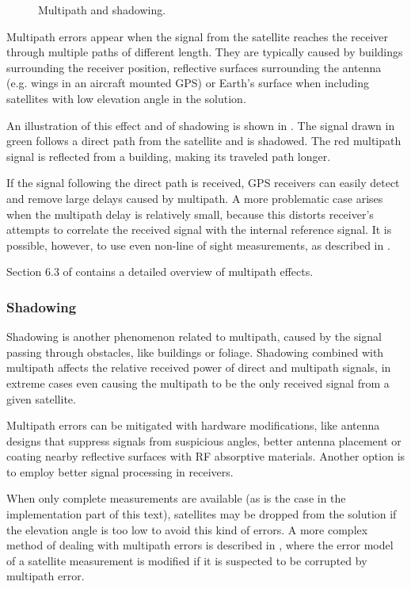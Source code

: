 \begin{figure}[t]
	\centering
	
	\caption{Multipath and shadowing.}
	\label{fig:multipath}
\end{figure}

Multipath errors appear when the signal from the satellite reaches the receiver
through multiple paths of different length.
They are typically caused by buildings surrounding the receiver position,
reflective surfaces surrounding the antenna (e.g. wings in an aircraft mounted GPS) or Earth's surface
when including satellites with low elevation angle in the solution.

An illustration of this effect and of shadowing is shown in .
The signal drawn in green follows a direct path from the satellite and is shadowed.
The red multipath signal is reflected from a building, making its traveled path longer.

If the signal following the direct path is received, GPS receivers can easily detect and remove large delays caused by multipath.
A more problematic case arises when the multipath delay is relatively small, because this distorts
receiver's attempts to correlate the received signal with the internal reference signal.
It is possible, however, to use even non-line of sight measurements, as described in \cite{bourdeau12}.

Section 6.3 of \cite{kaplan06} contains a detailed overview of multipath effects.

\subsubsection{Shadowing}
Shadowing is another phenomenon related to multipath, caused by the signal passing through obstacles, like buildings or foliage.
Shadowing combined with multipath affects the relative received power of direct and multipath signals, in extreme cases
even causing the multipath to be the only received signal from a given satellite.

Multipath errors can be mitigated with hardware modifications, like antenna designs that suppress signals from suspicious angles,
better antenna placement or coating nearby reflective surfaces with RF absorptive materials.
Another option is to employ better signal processing in receivers.

When only complete measurements are available (as is the case in the implementation part of this text),
satellites may be dropped from the solution if the elevation angle
is too low to avoid this kind of errors.
A more complex method of dealing with multipath errors is described in \cite{viandier08},
where the error model of a satellite measurement is modified if it is suspected to be corrupted
by multipath error.

